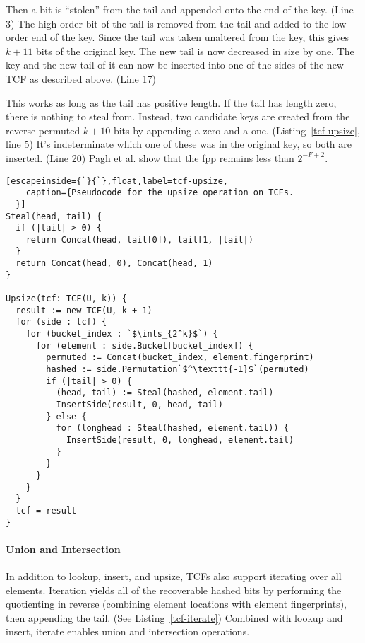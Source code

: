 \documentclass[sigconf]{acmart}
\newcommand{\ints}{\mathbb{Z}}
\newcommand{\etal}{et al.}
\begin{document}
Then a bit is ``stolen'' from the tail and appended onto the end of the key. (Line 3)
The high order bit of the tail is removed from the tail and added to the low-order end of the key.
Since the tail was taken unaltered from the key, this gives $k+11$ bits of the original key.
The new tail is now decreased in size by one.
The key and the new tail of it can now be inserted into one of the sides of the new TCF as described above. (Line 17)

This works as long as the tail has positive length.
If the tail has length zero, there is nothing to steal from.
Instead, two candidate keys are created from the reverse-permuted $k+10$ bits by appending a zero and a one. (Listing~\ref{tcf-upsize}, line 5)
It's indeterminate which one of these was in the original key, so both are inserted. (Line 20)
Pagh \etal{} show that the fpp remains less than $2^{-F+2}$.~\cite{psw}

\begin{lstlisting}[escapeinside={`}{`},float,label=tcf-upsize,
    caption={Pseudocode for the upsize operation on TCFs.
  }]
Steal(head, tail) {
  if (|tail| > 0) {
    return Concat(head, tail[0]), tail[1, |tail|)
  }
  return Concat(head, 0), Concat(head, 1)
}

Upsize(tcf: TCF(U, k)) {
  result := new TCF(U, k + 1)
  for (side : tcf) {
    for (bucket_index : `$\ints_{2^k}$`) {
      for (element : side.Bucket[bucket_index]) {
        permuted := Concat(bucket_index, element.fingerprint)
        hashed := side.Permutation`$^\texttt{-1}$`(permuted)
        if (|tail| > 0) {
          (head, tail) := Steal(hashed, element.tail)
          InsertSide(result, 0, head, tail)
        } else {
          for (longhead : Steal(hashed, element.tail)) {
            InsertSide(result, 0, longhead, element.tail)
          }
        }
      }
    }
  }
  tcf = result
}
\end{lstlisting}

\paragraph{Union and Intersection}
In addition to lookup, insert, and upsize, TCFs also support iterating over all elements.
Iteration yields all of the recoverable hashed bits by performing the quotienting in reverse (combining element locations with element fingerprints), then appending the tail. (See Listing~\ref{tcf-iterate})
Combined with lookup and insert, iterate enables union and intersection operations.
\end{document}
